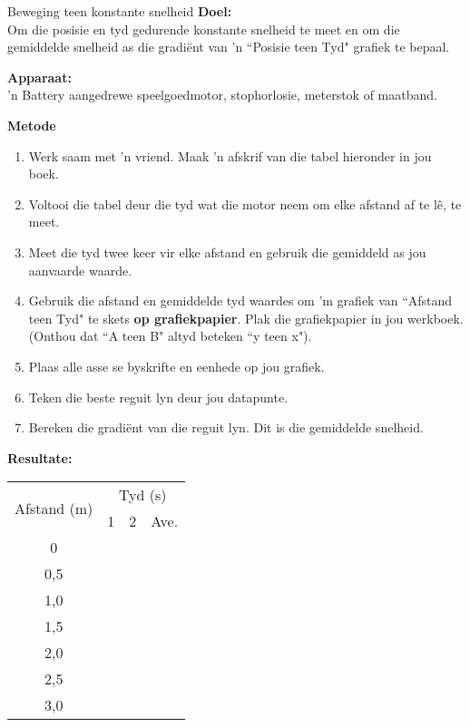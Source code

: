 \begin{g_experiment}{Beweging teen konstante snelheid}
            \nopagebreak
\textbf{Doel:}\\

Om die posisie en tyd gedurende konstante snelheid te meet en om die gemiddelde snelheid as die gradi\"ent van 'n ``Posisie teen Tyd" grafiek te bepaal.\par 

\textbf{Apparaat:}\\
 'n Battery aangedrewe speelgoedmotor, stophorlosie, meterstok of maatband.\par 
\textbf{Metode}\\
\begin{enumerate}[noitemsep, label=\textbf{\arabic*}. ] 
    \item Werk saam met 'n vriend. Maak 'n afskrif van die tabel hieronder in jou boek.
    \item Voltooi die tabel deur die tyd wat die motor neem om elke afstand af te l\^e, te meet.
    \item Meet die tyd twee keer vir elke afstand en gebruik die gemiddeld as jou aanvaarde waarde.
    \item Gebruik die afstand en gemiddelde tyd waardes om 'm grafiek van ``Afstand teen Tyd" te skets \textbf{op grafiekpapier}. Plak die grafiekpapier in jou werkboek. (Onthou dat ``A teen B" altyd beteken ``y teen x").
    \item Plaas alle asse se byskrifte en eenhede op jou grafiek.
    \item Teken die beste reguit lyn deur jou datapunte.
    \item Bereken die gradi\"ent van die reguit lyn.  Dit is die gemiddelde snelheid.
\end{enumerate}
        \par 
\textbf{Resultate:}
\begin{center}
\begin{tabular}{|c|p{0.5cm}|p{0.5cm}|p{0.5cm}|}\hline
\multirow{2}{*}{Afstand (m)}&\multicolumn{3}{c|}{Tyd (s)}\\\cline{2-4}
&1&2&Ave.\\\hline
0&&&\\\hline
0,5&&&\\\hline
1,0&&&\\\hline
1,5&&&\\\hline
2,0&&&\\\hline
2,5&&&\\\hline
3,0&&&\\\hline
\end{tabular}
\end{center}
    \par


\end{g_experiment}
